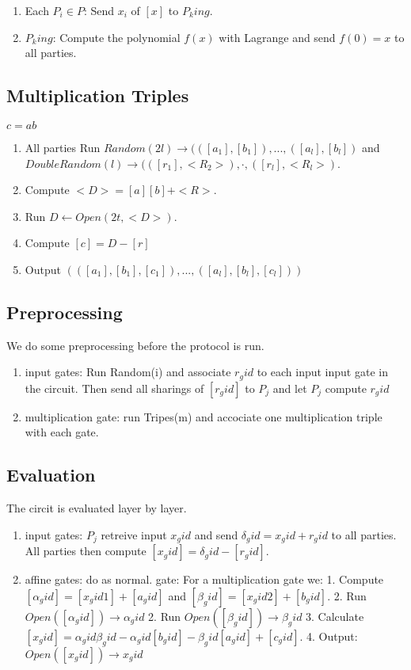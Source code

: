 \begin{enumerate}
    \item Each $P_i \in P$: Send $x_i$ of $[x]$ to $P_king$.
    \item $P_king$: Compute the polynomial $f(x)$ with Lagrange and send $f(0)=x$ to all parties.
\end{enumerate}

\subsection{Multiplication Triples}

$c=ab$
\begin{enumerate}
    \item All parties Run $Random(2l)\rightarrow(([a_1],[b_1]),...,([a_l], [b_l])$ and $DoubleRandom(l)\rightarrow(([r_1], <R_2>),\cdot, ([r_l], <R_l>)$.
    \item Compute $<D>=[a][b]+<R>$.
    \item Run $D \leftarrow Open(2t,<D>)$.
    \item Compute $[c]=D-[r]$
    \item Output $(([a_1],[b_1],[c_1]),...,([a_l], [b_l], [c_l]))$
\end{enumerate}

\subsection{Preprocessing}
We do some preprocessing before the protocol is run.

\begin{enumerate}
    \item input gates: Run Random(i) and associate $r_gid$ to each input input gate in the circuit. Then send all sharings of $[r_gid]$ to $P_j$ and let $P_j$ compute $r_gid$
    \item multiplication gate: run Tripes(m) and accociate one multiplication triple with each gate.
\end{enumerate}

\subsection{Evaluation}
The circit is evaluated layer by layer.

\begin{enumerate}
    \item input gates: $P_j$ retreive input $x_gid$ and send $\delta_gid=x_gid+r_gid$ to all parties. All parties then compute $[x_gid]=\delta_gid-[r_gid].$
    \item affine gates: do as normal.
    \multiplication gate: For a multiplication gate we: 
    1. Compute $[\alpha_gid]=[x_gid1]+[a_gid]$ and $[\beta_gid]=[x_gid2]+[b_gid]$.
    2. Run $Open([\alpha_gid])\rightarrow \alpha_gid$
    2. Run $Open([\beta_gid])\rightarrow \beta_gid$
    3. Calculate $[x_gid]=\alpha_gid \beta_gid - \alpha_gid[b_gid]- \beta_gid [a_gid] + [c_gid]$.
    4. Output: $Open([x_gid]) \rightarrow x_gid$


\end{enumerate}